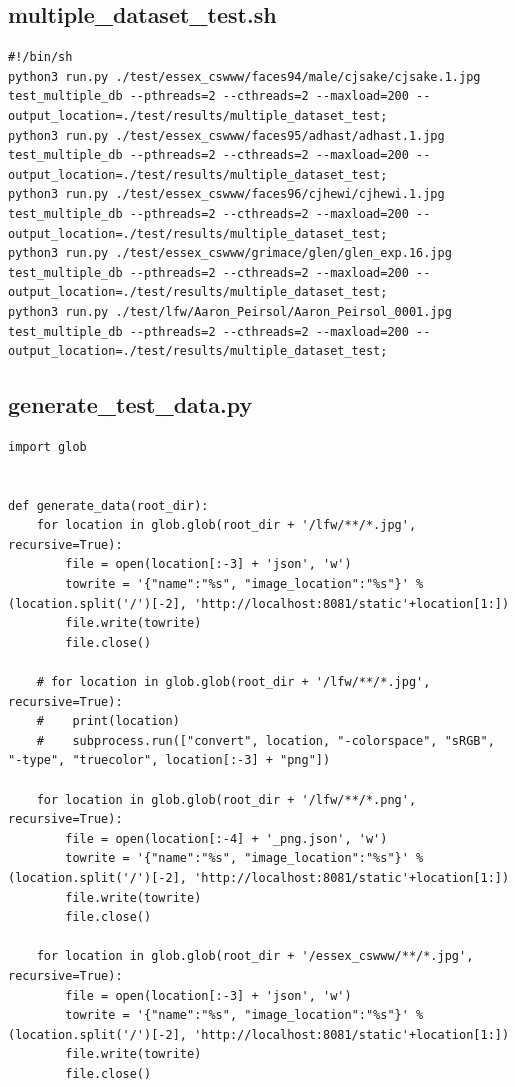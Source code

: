 \documentclass[12pt]{article}
\begin{document}
\begin{appendices}
\subsection{multiple\_dataset\_test.sh}
\begin{lstlisting}
#!/bin/sh
python3 run.py ./test/essex_cswww/faces94/male/cjsake/cjsake.1.jpg test_multiple_db --pthreads=2 --cthreads=2 --maxload=200 --output_location=./test/results/multiple_dataset_test;
python3 run.py ./test/essex_cswww/faces95/adhast/adhast.1.jpg test_multiple_db --pthreads=2 --cthreads=2 --maxload=200 --output_location=./test/results/multiple_dataset_test;
python3 run.py ./test/essex_cswww/faces96/cjhewi/cjhewi.1.jpg test_multiple_db --pthreads=2 --cthreads=2 --maxload=200 --output_location=./test/results/multiple_dataset_test;
python3 run.py ./test/essex_cswww/grimace/glen/glen_exp.16.jpg test_multiple_db --pthreads=2 --cthreads=2 --maxload=200 --output_location=./test/results/multiple_dataset_test;
python3 run.py ./test/lfw/Aaron_Peirsol/Aaron_Peirsol_0001.jpg test_multiple_db --pthreads=2 --cthreads=2 --maxload=200 --output_location=./test/results/multiple_dataset_test;
\end{lstlisting}

\subsection{generate\_test\_data.py}
\begin{lstlisting}
import glob


def generate_data(root_dir):
    for location in glob.glob(root_dir + '/lfw/**/*.jpg', recursive=True):
        file = open(location[:-3] + 'json', 'w')
        towrite = '{"name":"%s", "image_location":"%s"}' % (location.split('/')[-2], 'http://localhost:8081/static'+location[1:])
        file.write(towrite)
        file.close()

    # for location in glob.glob(root_dir + '/lfw/**/*.jpg', recursive=True):
    #    print(location)
    #    subprocess.run(["convert", location, "-colorspace", "sRGB", "-type", "truecolor", location[:-3] + "png"])

    for location in glob.glob(root_dir + '/lfw/**/*.png', recursive=True):
        file = open(location[:-4] + '_png.json', 'w')
        towrite = '{"name":"%s", "image_location":"%s"}' % (location.split('/')[-2], 'http://localhost:8081/static'+location[1:])
        file.write(towrite)
        file.close()

    for location in glob.glob(root_dir + '/essex_cswww/**/*.jpg', recursive=True):
        file = open(location[:-3] + 'json', 'w')
        towrite = '{"name":"%s", "image_location":"%s"}' % (location.split('/')[-2], 'http://localhost:8081/static'+location[1:])
        file.write(towrite)
        file.close()


\end{lstlisting}
\end{appendices}
\end{document}
